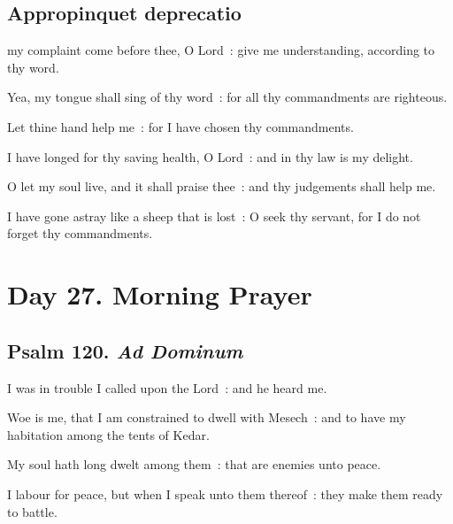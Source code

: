 \subsection{Appropinquet deprecatio}
 my complaint come before thee, O Lord~: give me understanding, according to thy word.\par
{}
Yea, my tongue shall sing of thy word~: for all thy commandments are righteous.\par
{}Let thine hand help me~: for I have chosen thy commandments.\par
{}I have longed for thy saving health, O Lord~: and in thy law is my delight.\par
{}O let my soul live, and it shall praise thee~: and thy judgements shall help me.\par
{}I have gone astray like a sheep that is lost~: O seek thy servant, for I do not forget thy commandments.\par

\section*{Day 27. Morning Prayer}

\subsection{Psalm 120. \textit{Ad Dominum}}

 I was in trouble I called upon the Lord~: and he heard me.\par
{}
Woe is me, that I am constrained to dwell with Mesech~: and to have my habitation among the tents of Kedar.\par
{}My soul hath long dwelt among them~: that are enemies unto peace.\par
{}I labour for peace, but when I speak unto them thereof~: they make them ready to battle.\par

